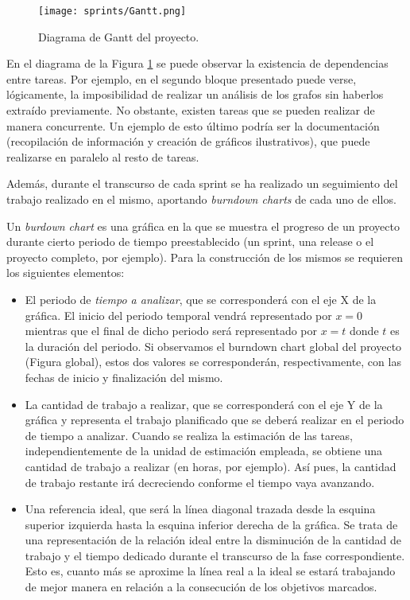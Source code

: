 \begin{figure}[H]
    \centering
    \texttt{[image: sprints/Gantt.png]}
    \caption{Diagrama de Gantt del proyecto.}
    \label{fig:gantt}
\end{figure}

En el diagrama de la Figura \ref{fig:gantt} se puede observar la existencia de dependencias entre tareas. Por ejemplo, en el segundo bloque presentado puede verse, lógicamente, la imposibilidad de realizar un análisis de los grafos sin haberlos extraído previamente. No obstante, existen tareas que se pueden realizar de manera concurrente. Un ejemplo de esto último podría ser la documentación (recopilación de información y creación de gráficos ilustrativos), que puede realizarse en paralelo al resto de tareas.

Además, durante el transcurso de cada sprint se ha realizado un seguimiento del trabajo realizado en el mismo, aportando \emph{burndown charts} de cada uno de ellos.

Un \emph{burdown chart} es una gráfica en la que se muestra el progreso de un proyecto durante cierto periodo de tiempo preestablecido (un sprint, una release o el proyecto completo, por ejemplo). Para la construcción de los mismos se requieren los siguientes elementos:
\begin{itemize}
\item El periodo de \emph{tiempo a analizar}, que se corresponderá con el eje X de la gráfica. El inicio del periodo temporal vendrá representado por $x = 0$ mientras que el final de dicho periodo será representado por $x = t$ donde $t$ es la duración del periodo. Si observamos el burndown chart global del proyecto (Figura global), estos dos valores se corresponderán, respectivamente, con las fechas de inicio y finalización del mismo.
\item La cantidad de trabajo a realizar, que se corresponderá con el eje Y de la gráfica y representa el trabajo planificado que se deberá realizar en el periodo de tiempo a analizar. Cuando se realiza la estimación de las tareas, independientemente de la unidad de estimación empleada, se obtiene una cantidad de trabajo a realizar (en horas, por ejemplo). Así pues, la cantidad de trabajo restante irá decreciendo conforme el tiempo vaya avanzando.
\item Una referencia ideal, que será la línea diagonal trazada desde la esquina superior izquierda hasta la esquina inferior derecha de la gráfica. Se trata de una representación de la relación ideal entre la disminución de la cantidad de trabajo y el tiempo dedicado durante el transcurso de la fase correspondiente. Esto es, cuanto más se aproxime la línea real a la ideal se estará trabajando de mejor manera en relación a la consecución de los objetivos marcados.
\end{itemize}

